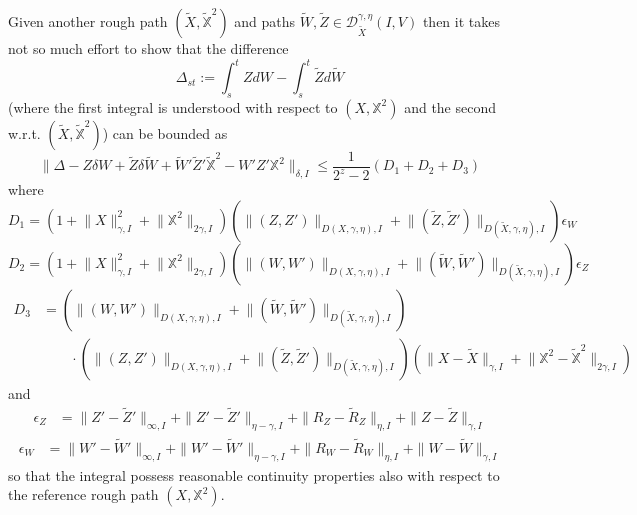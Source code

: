 \documentclass[a4paper,12pt,reqno]{amsproc}
\newcommand{\der}{\delta\!}
\newcommand{\DD}{\mathcal{D}}
\newcommand{\norm}[1]{\lVert #1\rVert}
\newcommand{\wt}{\widetilde}
\begin{document}
Given another rough path $(\wt X, \mathbb{\wt X}^2)$ and paths $\wt W,
\wt Z \in \DD_{\wt X}^{\gamma,\eta}(I,V)$ then
it takes not so much effort to show that
the difference
$$
\Delta_{st} := \int_s^t Z dW - \int_s^t \widetilde Z d\widetilde W
$$
(where the first integral is understood with respect to $(X,\mathbb{X}^2)$
and the second w.r.t. $(\widetilde X, \mathbb{\widetilde X}^2)$)
can be bounded as 
\begin{equation}
\label{eq:continuity}
\|\Delta -Z \der W + \widetilde Z \der \widetilde W+ \widetilde W' \widetilde Z' \mathbb{\widetilde X}^2 - W'  Z'
\mathbb{X}^2\|_{\delta,I} \le \frac{1}{2^z-2} (D_1+D_2+D_3)
\end{equation}
where
$$
D_1 = (1+\norm{X}_{\gamma,I}^2  + \norm{\mathbb{X}^2}_{2\gamma,I})
(\norm{(Z,Z')}_{D(X,\gamma,\eta),I}+\norm{(\widetilde Z,\widetilde
  Z')}_{D(\widetilde X,\gamma,\eta),I}) \epsilon_W
$$
$$
D_2 = (1+\norm{X}_{\gamma,I}^2  + \norm{\mathbb{X}^2}_{2\gamma,I})
(\norm{(W,W')}_{D(X,\gamma,\eta),I}+\norm{(\widetilde W,\widetilde
  W')}_{D(\widetilde X,\gamma,\eta),I}) \epsilon_Z
$$
\begin{equation*}
  \begin{split}
D_3  & = (\norm{(W,W')}_{D(X,\gamma,\eta),I}+\norm{(\widetilde W,\widetilde
  W')}_{D(\widetilde X,\gamma,\eta),I}) 
\\ & \qquad \cdot 
(\norm{(Z,Z')}_{D(X,\gamma,\eta),I}+\norm{(\widetilde Z,\widetilde
  Z')}_{D(\widetilde X,\gamma,\eta),I}) (\norm{X-\widetilde X}_{\gamma,I}  +
\norm{\mathbb{X}^2-\mathbb{\widetilde X}^2}_{2\gamma,I})    
  \end{split}
\end{equation*}
and
\begin{equation*}
  \begin{split}
\epsilon_Z & = \|Z'-\widetilde Z'\|_{\infty,I} + \|Z'-\widetilde
Z'\|_{\eta-\gamma,I} + \|R_Z-\widetilde R_Z\|_{\eta,I}+ \|Z-\widetilde
Z\|_{\gamma,I} 
  \end{split}
\end{equation*}
\begin{equation*}
  \begin{split}
\epsilon_W & = 
\|W'-\widetilde W'\|_{\infty,I} + \|W'-\widetilde
W'\|_{\eta-\gamma,I} + \|R_W-\widetilde R_W\|_{\eta,I}+ \|W-\widetilde
W\|_{\gamma,I}        
  \end{split}
\end{equation*}
so that the integral possess reasonable continuity properties also
with respect to the reference rough path $(X, \mathbb{X}^2)$.
\end{document}
